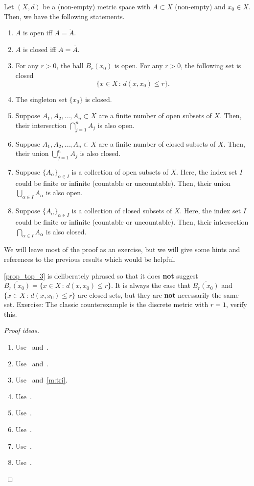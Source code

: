 \begin{prop}
\label{prop:defn_top}
Let $(X,d)$ be a (non-empty) metric space with $A\subset X$ (non-empty) and $x_0\in X$. Then, we have the following statements.
\begin{enumerate}
	\item \label{prop_top_1} $A$ is open iff $A = \mathring{A}$.
	\item \label{prop_top_2} $A$ is closed iff $A = \overline{A}$.
	\item \label{prop_top_3} For any $r>0$, the ball $B_r(x_0)$ is open. For any $r>0$, the following set is closed
	\[
	\{x \in X\, : \, d(x,x_0)\le r\}.
	\]
	\item \label{prop_top_4} The singleton set $\{x_0\}$ is closed.
	\item \label{prop_top_5} Suppose $A_1,A_2,\dots, A_n\subset X$ are a finite number of open subsets of $X$. Then, their intersection $\bigcap_{j=1}^n A_j$ is also open.
	\item \label{prop_top_6} Suppose $A_1,A_2,\dots, A_n \subset X$ are a finite number of closed subsets of $X$. Then, their union $\bigcup_{j=1}^n A_j$ is also closed.
	\item \label{prop_top_7} Suppose $\{A_\alpha\}_{\alpha \in I}$ is a collection of open subsets of $X$. Here, the index set $I$ could be finite or infinite (countable or uncountable). Then, their union $\bigcup_{\alpha \in I}A_\alpha$ is also open.
	\item \label{prop_top_8} Suppose $\{A_\alpha\}_{\alpha \in I}$ is a collection of closed subsets of $X$. Here, the index set $I$ could be finite or infinite (countable or uncountable). Then, their intersection $\bigcap_{\alpha \in I}A_\alpha$ is also closed.
\end{enumerate}
\end{prop}
We will leave most of the proof as an exercise, but we will give some hints and references to the previous results which would be helpful.
\begin{rem}
\ref{prop_top_3} is deliberately phrased so that it does \textbf{not} suggest $\overline{B_r(x_0)} = \{x \in X \, : \, d(x,x_0)\le r\}$. It is always the case that $\overline{B_r(x_0)}$ and $\{x \in X \, : \, d(x,x_0)\le r\}$ are closed sets, but they are \textbf{not} necessarily the same set. Exercise: The classic counterexample is the discrete metric with $r = 1$, verify this.
\end{rem}
\begin{proof}[Proof ideas]
\begin{enumerate}
	\item Use~ and~.
	\item Use~ and~.
	\item Use~ and~\ref{m:tri}.
	\item Use~.
	\item Use~.
	\item Use~.
	\item Use~.
	\item Use~.
\end{enumerate}
\end{proof}